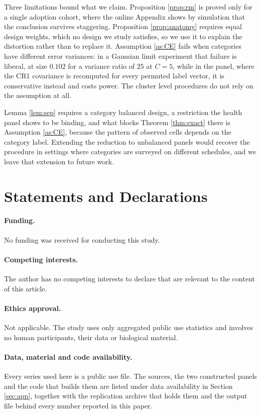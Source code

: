 \documentclass[12pt]{article}
\theoremstyle{definition}
\numberwithin{equation}{section}
\begin{document}
Three limitations bound what we claim. Proposition \ref{prop:rm} is proved only
for a single adoption cohort, where the online Appendix shows by simulation that
the conclusion survives staggering. Proposition \ref{prop:anatomy} requires equal
design weights, which no design we study satisfies, so we use it to explain the
distortion rather than to replace it. Assumption \ref{as:CE} fails when categories
have different error variances: in a Gaussian limit experiment that failure is
liberal, at size $0.102$ for a variance ratio of $25$ at $C = 5$, while in the
panel, where the CR1 covariance is recomputed for every permuted label vector, it
is conservative instead and costs power. The cluster level procedures do not rely
on the assumption at all.

Lemma \ref{lem:sep} requires a category balanced design, a restriction the
health panel shows to be binding, and what blocks Theorem \ref{thm:exact} there
is Assumption \ref{as:CE}, because the pattern of observed cells depends on the
category label. Extending the reduction to unbalanced panels would recover the
procedure in settings where categories are surveyed on different schedules, and
we leave that extension to future work.

\section*{Statements and Declarations}

\paragraph{Funding.} No funding was received for conducting this study.

\paragraph{Competing interests.} The author has no competing interests to
declare that are relevant to the content of this article.

\paragraph{Ethics approval.} Not applicable. The study uses only aggregated
public use statistics and involves no human participants, their data or
biological material.

\paragraph{Data, material and code availability.} Every series used here is a
public use file. The sources, the two constructed panels and the code that
builds them are listed under data availability in Section \ref{sec:app},
together with the replication archive that holds them and the output file
behind every number reported in this paper.
\end{document}
